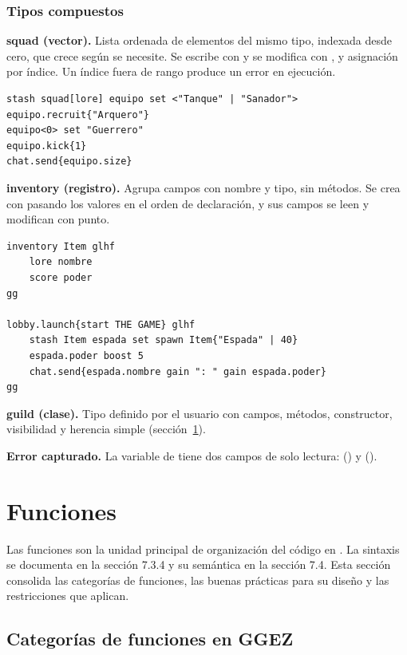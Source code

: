 \subsubsection{Tipos compuestos}

\textbf{squad (vector).} Lista ordenada de elementos del mismo tipo, indexada desde cero, que crece según se necesite. Se escribe con \kw{< >} y se modifica con ,  y asignación por índice. Un índice fuera de rango produce un error en ejecución.
\begin{lstlisting}
stash squad[lore] equipo set <"Tanque" | "Sanador">
equipo.recruit{"Arquero"}
equipo<0> set "Guerrero"
equipo.kick{1}
chat.send{equipo.size}
\end{lstlisting}

\textbf{inventory (registro).} Agrupa campos con nombre y tipo, sin métodos. Se crea con  pasando los valores en el orden de declaración, y sus campos se leen y modifican con punto.
\begin{lstlisting}
inventory Item glhf
    lore nombre
    score poder
gg

lobby.launch{start THE GAME} glhf
    stash Item espada set spawn Item{"Espada" | 40}
    espada.poder boost 5
    chat.send{espada.nombre gain ": " gain espada.poder}
gg
\end{lstlisting}

\textbf{guild (clase).} Tipo definido por el usuario con campos, métodos, constructor, visibilidad y herencia simple (sección~\ref{sec:funciones}).

\textbf{Error capturado.} La variable de  tiene dos campos de solo lectura:  () y  ().

\newpage
\section{Funciones}
\label{sec:funciones}

Las funciones son la unidad principal de organización del código en \ggez. La sintaxis se documenta en la sección 7.3.4 y su semántica en la sección 7.4. Esta sección consolida las categorías de funciones, las buenas prácticas para su diseño y las restricciones que aplican.

\subsection{Categorías de funciones en GGEZ}

